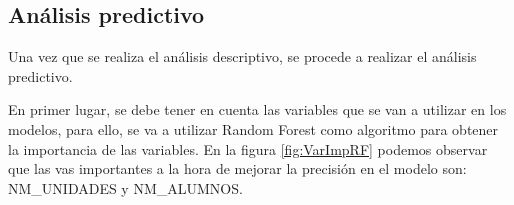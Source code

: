 \subsection{Análisis predictivo}
Una vez que se realiza el análisis descriptivo, se procede a realizar el análisis predictivo.

En primer lugar, se debe tener en cuenta las variables que se van a utilizar en los modelos, para ello, se va a utilizar Random Forest como algoritmo para obtener la importancia de las variables. En la figura \ref{fig:VarImpRF} podemos observar que las vas importantes a la hora de mejorar la precisión en el modelo son: NM\_UNIDADES y NM\_ALUMNOS.





